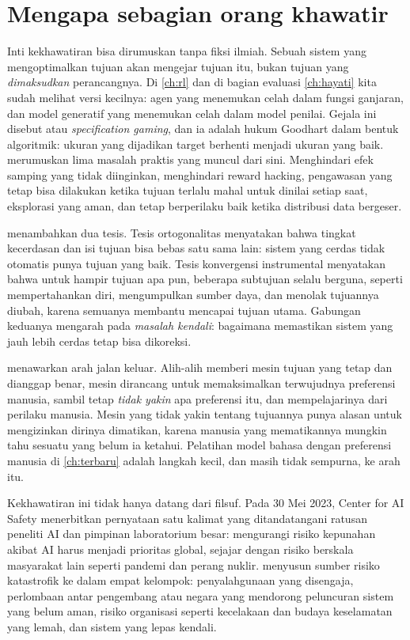 \section{Mengapa sebagian orang khawatir}

Inti kekhawatiran bisa dirumuskan tanpa fiksi ilmiah. Sebuah sistem yang mengoptimalkan tujuan akan mengejar tujuan itu, bukan
tujuan yang \emph{dimaksudkan} perancangnya. Di \cref{ch:rl} dan di bagian evaluasi \cref{ch:hayati} kita sudah melihat versi kecilnya:
agen yang menemukan celah dalam fungsi ganjaran, dan model generatif yang menemukan celah dalam model penilai. Gejala ini disebut
 atau \emph{specification gaming}, dan ia adalah hukum Goodhart dalam bentuk algoritmik: ukuran yang dijadikan
target berhenti menjadi ukuran yang baik. \citet{amodei2016} merumuskan lima masalah praktis yang muncul dari sini. Menghindari efek
samping yang tidak diinginkan, menghindari reward hacking, pengawasan yang tetap bisa dilakukan ketika tujuan terlalu mahal untuk
dinilai setiap saat, eksplorasi yang aman, dan tetap berperilaku baik ketika distribusi data bergeser.

\citet{bostrom2014} menambahkan dua tesis. Tesis ortogonalitas menyatakan bahwa tingkat kecerdasan dan isi tujuan bisa bebas satu
sama lain: sistem yang cerdas tidak otomatis punya tujuan yang baik. Tesis konvergensi instrumental menyatakan bahwa untuk
hampir tujuan apa pun, beberapa subtujuan selalu berguna, seperti mempertahankan diri, mengumpulkan sumber daya, dan menolak tujuannya
diubah, karena semuanya membantu mencapai tujuan utama. Gabungan keduanya mengarah pada \emph{masalah kendali}: bagaimana memastikan
sistem yang jauh lebih cerdas tetap bisa dikoreksi.

\citet{russell2019} menawarkan arah jalan keluar. Alih-alih memberi mesin tujuan yang tetap dan dianggap benar, mesin dirancang untuk
memaksimalkan terwujudnya preferensi manusia, sambil tetap \emph{tidak yakin} apa preferensi itu, dan mempelajarinya dari perilaku
manusia. Mesin yang tidak yakin tentang tujuannya punya alasan untuk mengizinkan dirinya dimatikan, karena manusia yang mematikannya
mungkin tahu sesuatu yang belum ia ketahui. Pelatihan model bahasa dengan preferensi manusia di \cref{ch:terbaru} adalah langkah
kecil, dan masih tidak sempurna, ke arah itu.

Kekhawatiran ini tidak hanya datang dari filsuf. Pada 30 Mei 2023, Center for AI Safety menerbitkan pernyataan satu kalimat yang
ditandatangani ratusan peneliti AI dan pimpinan laboratorium besar: mengurangi risiko kepunahan akibat AI harus menjadi prioritas
global, sejajar dengan risiko berskala masyarakat lain seperti pandemi dan perang nuklir. \citet{hendrycks2023} menyusun sumber risiko
katastrofik ke dalam empat kelompok: penyalahgunaan yang disengaja, perlombaan antar pengembang atau negara yang mendorong peluncuran
sistem yang belum aman, risiko organisasi seperti kecelakaan dan budaya keselamatan yang lemah, dan sistem yang lepas kendali.

